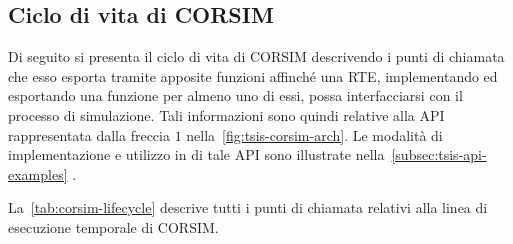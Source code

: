 \subsection{Ciclo di vita di CORSIM}\label{subsec:corsim-lifecycle}
Di seguito si presenta il ciclo di vita di \acs{CORSIM} descrivendo i punti di chiamata che esso esporta tramite apposite funzioni affinché una \acs{RTE}, implementando ed esportando una funzione per almeno uno di essi, possa interfacciarsi con il processo di simulazione. Tali informazioni sono quindi relative alla \acs{API} rappresentata dalla freccia $1$ nella~\vref{fig:tsis-corsim-arch}. Le modalità di implementazione e utilizzo in \CC{} di tale \acs{API} sono illustrate nella~\autoref{subsec:tsis-api-examples} .

La~\vref{tab:corsim-lifecycle} descrive tutti i punti di chiamata relativi alla linea di esecuzione temporale di \acs{CORSIM}.
